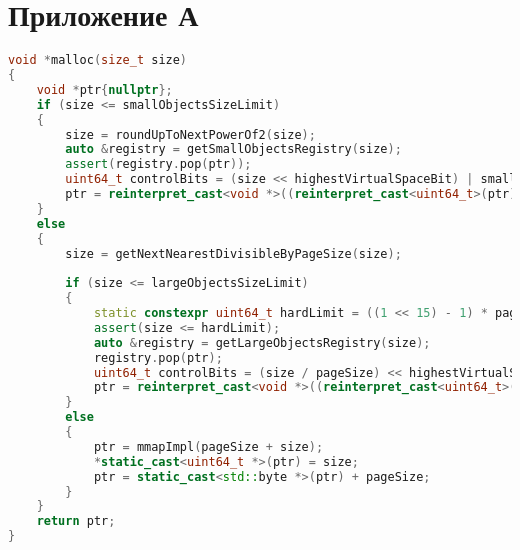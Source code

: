 \chapter{Приложение А}
\label{cha:appendix1}


\captionsetup{justification=centering}

\begin{lstlisting}[language=c++,caption={Код функуции выделения памяти},numbers=none,xleftmargin=.1\textwidth,xrightmargin=.1\textwidth]
void *malloc(size_t size)
{
	void *ptr{nullptr};
	if (size <= smallObjectsSizeLimit)
	{
		size = roundUpToNextPowerOf2(size);
		auto &registry = getSmallObjectsRegistry(size);
		assert(registry.pop(ptr));
		uint64_t controlBits = (size << highestVirtualSpaceBit) | smallObjectMask;
		ptr = reinterpret_cast<void *>((reinterpret_cast<uint64_t>(ptr) & workingAddressMask) | controlBits);
	}
	else
	{
		size = getNextNearestDivisibleByPageSize(size);
		
		if (size <= largeObjectsSizeLimit)
		{
			static constexpr uint64_t hardLimit = ((1 << 15) - 1) * pageSize;
			assert(size <= hardLimit);
			auto &registry = getLargeObjectsRegistry(size);
			registry.pop(ptr);
			uint64_t controlBits = (size / pageSize) << highestVirtualSpaceBit;
			ptr = reinterpret_cast<void *>((reinterpret_cast<uint64_t>(ptr) & workingAddressMask) | controlBits);
		}
		else
		{
			ptr = mmapImpl(pageSize + size);
			*static_cast<uint64_t *>(ptr) = size;
			ptr = static_cast<std::byte *>(ptr) + pageSize;
		}
	}
	return ptr;
}
\end{lstlisting}
